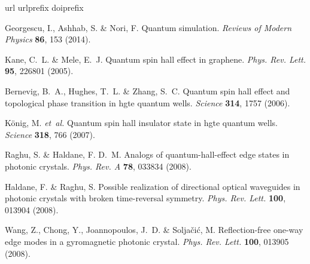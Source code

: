 \documentclass[
aps,
prl,
groupedaddress,
superscriptaddress,
floatfix,
notitlepage
]{revtex4-1}
\begin{document}
\begin{thebibliography}{10}
	\expandafter\ifx\csname url\endcsname\relax
	\def\url#1{\texttt{#1}}\fi
	\expandafter\ifx\csname urlprefix\endcsname\relax\def\urlprefix{URL }\fi
	\expandafter\ifx\csname doiprefix\endcsname\relax\def\doiprefix{DOI }\fi
	\providecommand{\bibinfo}[2]{#2}
	\providecommand{\eprint}[2][]{\url{#2}}
	
	\bibinfo{author}{Georgescu, I.}, \bibinfo{author}{Ashhab, S.} \&
	\bibinfo{author}{Nori, F.}
	\newblock \bibinfo{title}{Quantum simulation}.
	\newblock \emph{\bibinfo{journal}{Reviews of Modern Physics}}
	\textbf{\bibinfo{volume}{86}}, \bibinfo{pages}{153} (\bibinfo{year}{2014}).
	
	\bibinfo{author}{Kane, C.~L.} \& \bibinfo{author}{Mele, E.~J.}
	\newblock \bibinfo{title}{Quantum spin hall effect in graphene}.
	\newblock \emph{\bibinfo{journal}{Phys. Rev. Lett.}}
	\textbf{\bibinfo{volume}{95}}, \bibinfo{pages}{226801}
	(\bibinfo{year}{2005}).
	
	\bibinfo{author}{Bernevig, B.~A.}, \bibinfo{author}{Hughes, T.~L.} \&
	\bibinfo{author}{Zhang, S.~C.}
	\newblock \bibinfo{title}{Quantum spin hall effect and topological phase
		transition in hgte quantum wells}.
	\newblock \emph{\bibinfo{journal}{Science}} \textbf{\bibinfo{volume}{314}},
	\bibinfo{pages}{1757} (\bibinfo{year}{2006}).
	
	\bibinfo{author}{K\"{o}nig, M.} \emph{et~al.}
	\newblock \bibinfo{title}{Quantum spin hall insulator state in hgte quantum
		wells}.
	\newblock \emph{\bibinfo{journal}{Science}} \textbf{\bibinfo{volume}{318}},
	\bibinfo{pages}{766} (\bibinfo{year}{2007}).
	
	\bibinfo{author}{Raghu, S.} \& \bibinfo{author}{Haldane, F. D.~M.}
	\newblock \bibinfo{title}{Analogs of quantum-hall-effect edge states in
		photonic crystals}.
	\newblock \emph{\bibinfo{journal}{Phys. Rev. A}} \textbf{\bibinfo{volume}{78}},
	\bibinfo{pages}{033834} (\bibinfo{year}{2008}).
	
	\bibinfo{author}{Haldane, F.} \& \bibinfo{author}{Raghu, S.}
	\newblock \bibinfo{title}{Possible realization of directional optical
		waveguides in photonic crystals with broken time-reversal symmetry}.
	\newblock \emph{\bibinfo{journal}{Phys. Rev. Lett.}}
	\textbf{\bibinfo{volume}{100}}, \bibinfo{pages}{013904}
	(\bibinfo{year}{2008}).
	
	\bibinfo{author}{Wang, Z.}, \bibinfo{author}{Chong, Y.},
	\bibinfo{author}{Joannopoulos, J.~D.} \& \bibinfo{author}{Solja{\v{c}}i{\'c},
		M.}
	\newblock \bibinfo{title}{Reflection-free one-way edge modes in a gyromagnetic
		photonic crystal}.
	\newblock \emph{\bibinfo{journal}{Phys. Rev. Lett.}}
	\textbf{\bibinfo{volume}{100}}, \bibinfo{pages}{013905}
	(\bibinfo{year}{2008}).
	

\end{thebibliography}
\end{document}
